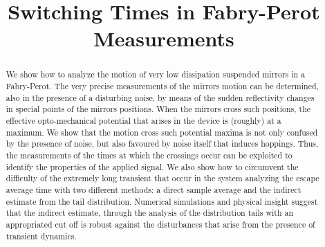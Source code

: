 \documentclass[conference]{IEEEtran}
\begin{document}
%
\title{Switching Times in Fabry-Perot Measurements}


\author{
\and
{}
\and
{}
}
 

\maketitle


\begin{abstract}
We show how to analyze the motion of very low dissipation suspended mirrors in a Fabry-Perot. The very precise measurements of the mirrors motion can be determined, also in the presence of a disturbing noise, by means of the sudden reflectivity changes in special points of the  mirrors positions.
When the mirrors cross such positions, the effective opto-mechanical potential that arises in the device is (roughly) at a maximum. We show that the motion cross such potential maxima is not only confused by the presence of noise, but also favoured by noise itself that induces hoppings. Thus, the measurements of the times at which the crossings occur can be exploited to identify the properties of the applied signal. We also show how to circumvent the difficulty of the extremely long transient that occur in the system analyzing the escape average time with two different methods: a direct sample average and the indirect estimate from the tail distribution. Numerical simulations and physical insight suggest that the indirect estimate, through the analysis of the distribution tails with an appropriated cut off is robust against the disturbances that arise from the presence of transient dynamics. 
\end{abstract}
\IEEEpeerreviewmaketitle
\end{document}
